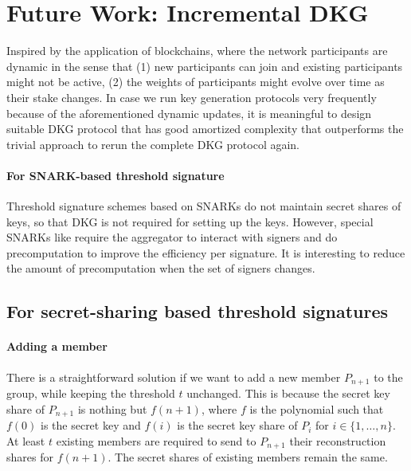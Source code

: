 \section{Future Work: Incremental DKG} \label{sec:future-dkg}

Inspired by the application of blockchains, where the network participants are dynamic in the sense that (1) new participants can join and existing participants might not be active, (2) the weights of participants might evolve over time as their stake changes. In case we run key generation protocols very frequently because of the aforementioned dynamic updates, it is meaningful to design suitable DKG protocol that has good amortized complexity that outperforms the trivial approach to rerun the complete DKG protocol again. 

\paragraph{For SNARK-based threshold signature} Threshold signature schemes based on SNARKs do not maintain secret shares of keys, so that DKG is not required for setting up the keys. However, special SNARKs like \cite{DBLP:conf/ccs/DasCXNB023} require the aggregator to interact with signers and do precomputation to improve the efficiency per signature. It is interesting to reduce the amount of precomputation when the set of signers changes. 

\subsection{For secret-sharing based threshold signatures} 

\paragraph{Adding a member} There is a straightforward solution if we want to add a new member $P_{n+1}$ to the group, while keeping the threshold $t$ unchanged. This is because the secret key share of $P_{n+1}$ is nothing but $f(n+1)$, where $f$ is the polynomial such that $f(0)$ is the secret key and $f(i)$ is the secret key share of $P_i$ for $i\in\{1,\dots, n\}$. At least $t$ existing members are required to send to $P_{n+1}$ their reconstruction shares for $f(n+1)$. The secret shares of existing members remain the same. 

